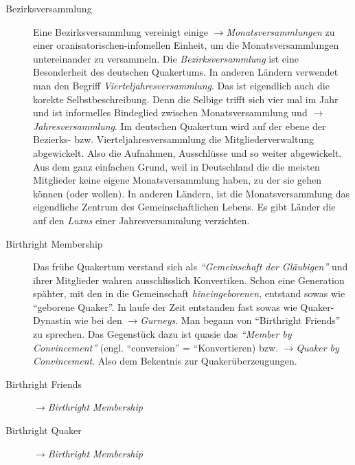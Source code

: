 \begin{description}
 \item[Bezirksversammlung] Eine Bezirksversammlung vereinigt einige $\to$\textit{Monatsversammlungen} zu einer oranisatorischen-infomellen Einheit, um die Monatsversammlungen untereinander zu versammeln. Die \textit{Bezirksversammlung} ist eine Besonderheit des deutschen Quakertums. In anderen Ländern verwendet man den Begriff \textit{Vierteljahresversammlung}. Das ist eigendlich auch die korekte Selbstbeschreibung. Denn die Selbige trifft sich vier mal im Jahr und ist informelles Bindeglied zwischen Monatsversammlung und $\to$\textit{Jahresversammlung}. Im deutschen Quakertum wird auf der ebene der Bezierks- bzw. Vierteljahresversammlung die Mitgliederverwaltung abgewickelt. Also die Aufnahmen, Ausschlüsse und so weiter abgewickelt. Aus dem ganz einfachen Grund, weil in Deutschland die die meisten Mitglieder keine eigene Monatsversammlung haben, zu der sie gehen können (oder wollen). In anderen Ländern, ist die Monatsversammlung das eigendliche Zentrum des Gemeinschaftlichen Lebens. Es gibt Länder die auf den \textit{Luxus} einer Jahresversammlung verzichten.
 
 \item[Birthright Membership] Das frühe Quakertum verstand sich als \textit{"`Gemeinschaft der Gläubigen"'} und ihrer Mitglieder wahren ausschlisslich Konvertiken. Schon eine Generation spähter, mit den in die Gemeinschaft \textit{hineingeborenen}, entstand sowas wie "`geborene Quaker"'. In laufe der Zeit entstanden fast sowas wie Quaker-Dynastin wie bei den $\to$\textit{Gurneys}. Man begann von "`Birthright Friends"' zu sprechen. Das Gegenstück dazu ist quasie das \textit{"`Member by Convincement"'} (engl. ``conversion'' = ``Konvertieren) bzw. $\to$\textit{Quaker by Convincement}. Also dem Bekentnis zur Quakerüberzeugungen.
 
 \item[Birthright Friends] $\to$\textit{Birthright Membership}
 
 \item[Birthright Quaker] $\to$\textit{Birthright Membership}


\end{description}
